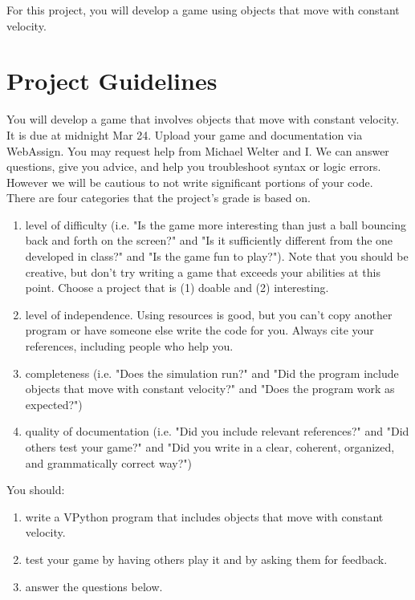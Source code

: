 

\longgoal

For this project, you will develop a game using objects that move with constant velocity.

\section*{Project Guidelines}

You will develop a game that involves objects that move with constant velocity. It is due at midnight Mar 24. Upload your game and documentation via WebAssign. You may request help from Michael Welter and I. We can answer questions, give you advice, and help you troubleshoot syntax or logic errors. However we will be cautious to not write significant portions of your code.\\

\noindent
There are four categories that the project's grade is based on.

\begin{enumerate}
	\item level of difficulty (i.e. "Is the game more interesting than just a ball bouncing back and forth on the screen?" and "Is it sufficiently different from the one developed in class?" and "Is the game fun to play?").  Note that you should be creative, but don't try writing a game that exceeds your abilities at this point. Choose a project that is (1) doable and (2) interesting.
	\item level of independence.  Using resources is good, but you can't copy another program or have someone else write the code for you. Always cite your references, including people who help you.
	\item completeness (i.e.  "Does the simulation run?" and  "Did the program include objects that move with constant velocity?" and "Does the program work as expected?")
	\item quality of documentation (i.e. "Did you include relevant references?" and "Did others test your game?" and "Did you write in a clear, coherent, organized, and grammatically correct way?")
\end{enumerate}

\noindent
You should:

\begin{enumerate}
	\item write a VPython program that includes objects that move with constant velocity.
	\item test your game by having others play it and by asking them for feedback.
	\item answer the questions below.
\end{enumerate}

